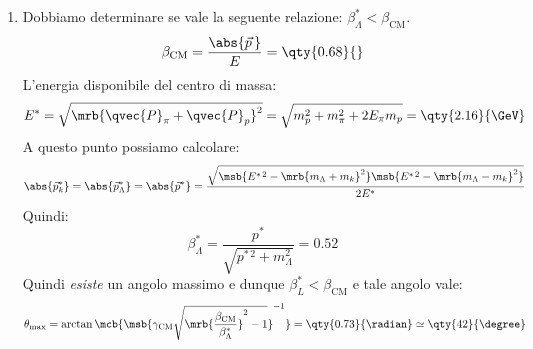\begin{example}[]
\begin{enumerate}
    \item Dobbiamo determinare se vale la seguente relazione: $\beta^\ast
      _{\Lambda} < \beta _\text{CM}$.
      \begin{equation}
        \beta _\text{CM} = \frac{\abs{\vec{p}\,}}{E} = \qty{0.68}{}
      \end{equation}
      L'energia disponibile del centro di massa:
      \begin{equation}
        E ^{\ast} = \sqrt{\mrb{\qvec{P}_{\pi} + \qvec{P}_{p}}^{2}} = \sqrt{m
        _{p}^{2} + m _{\pi}^{2} + 2 E _{\pi} m _{p}} = \qty{2.16}{\GeV}
      \end{equation}
      A questo punto possiamo calcolare:
      \begin{equation}
        \abs{\vec{p}_{k}^{\ast}} = \abs{\vec{p}_{\Lambda}^{\ast}} =
        \abs{\vec{p}^{\ast}} = \frac{\sqrt{\msb{E ^{\ast\,2} - \mrb{m
        _{\Lambda} + m_k}^{2}} \msb{E ^{\ast\,2} - \mrb{m _{\Lambda} - m
        _{k}}^{2}}}}{2 E^\ast}
      \end{equation}
      Quindi:
      \begin{equation}
        \beta _{\Lambda}^{\ast} = \frac{p ^{\ast}}{\sqrt{p ^{\ast\, 2} + m
        _{\Lambda}^{2}}} = 0.52
      \end{equation}
      Quindi \textit{esiste} un angolo massimo e dunque $\beta _{L}^{\ast} <
      \beta _\text{CM}$ e tale angolo vale:
      \begin{equation}
        \theta _\text{max} = \arctan \mcb{\msb{\gamma _\text{CM}
        \sqrt{\mrb{\frac{\beta _\text{CM}}{\beta ^{\ast}_{\Lambda}}}^{2} -
        1}}^{-1}} = \qty{0.73}{\radian} \simeq \qty{42}{\degree}
      \end{equation}
  \end{enumerate}
\end{example}

